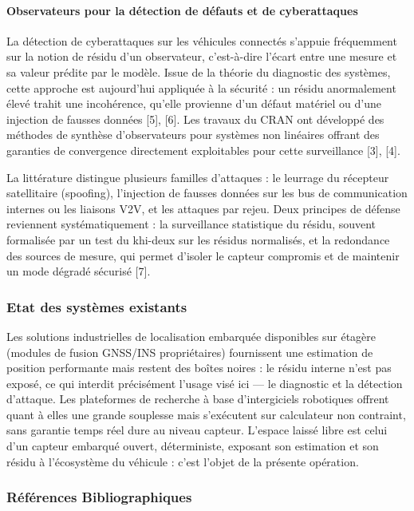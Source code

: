 \paragraph{Observateurs pour la détection de défauts et de cyberattaques}

La détection de cyberattaques sur les véhicules connectés s’appuie fréquemment sur la notion de résidu d’un observateur, c’est-à-dire l’écart entre une mesure et sa valeur prédite par le modèle. Issue de la théorie du diagnostic des systèmes, cette approche est aujourd’hui appliquée à la sécurité : un résidu anormalement élevé trahit une incohérence, qu’elle provienne d’un défaut matériel ou d’une injection de fausses données [5], [6]. Les travaux du CRAN ont développé des méthodes de synthèse d’observateurs pour systèmes non linéaires offrant des garanties de convergence directement exploitables pour cette surveillance [3], [4].

La littérature distingue plusieurs familles d’attaques : le leurrage du récepteur satellitaire (spoofing), l’injection de fausses données sur les bus de communication internes ou les liaisons V2V, et les attaques par rejeu. Deux principes de défense reviennent systématiquement : la surveillance statistique du résidu, souvent formalisée par un test du khi-deux sur les résidus normalisés, et la redondance des sources de mesure, qui permet d’isoler le capteur compromis et de maintenir un mode dégradé sécurisé [7].

\subsubsection{Etat des systèmes existants}

Les solutions industrielles de localisation embarquée disponibles sur étagère (modules de fusion GNSS/INS propriétaires) fournissent une estimation de position performante mais restent des boîtes noires : le résidu interne n’est pas exposé, ce qui interdit précisément l’usage visé ici — le diagnostic et la détection d’attaque. Les plateformes de recherche à base d’intergiciels robotiques offrent quant à elles une grande souplesse mais s’exécutent sur calculateur non contraint, sans garantie temps réel dure au niveau capteur. L’espace laissé libre est celui d’un capteur embarqué ouvert, déterministe, exposant son estimation et son résidu à l’écosystème du véhicule : c’est l’objet de la présente opération.

\subsubsection{Références Bibliographiques}

